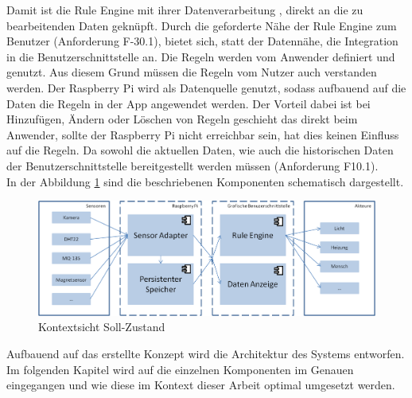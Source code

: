 Damit ist die Rule Engine mit ihrer Datenverarbeitung \cite{Hayes-Roth:1985:RS:4284.4286}, direkt an die zu bearbeitenden Daten geknüpft. Durch die geforderte Nähe der Rule Engine zum Benutzer (Anforderung F-30.1), bietet sich, statt der Datennähe, die Integration in die Benutzerschnittstelle an. Die Regeln werden vom Anwender definiert und genutzt. Aus diesem Grund müssen die Regeln vom Nutzer auch verstanden werden. Der Raspberry Pi wird als Datenquelle genutzt, sodass aufbauend auf die Daten die Regeln in der App angewendet werden. Der Vorteil dabei ist bei Hinzufügen, Ändern oder Löschen von Regeln geschieht das direkt beim Anwender, sollte der Raspberry Pi nicht erreichbar sein, hat dies keinen Einfluss auf die Regeln. Da sowohl die aktuellen Daten, wie auch die historischen Daten der Benutzerschnittstelle bereitgestellt werden müssen (Anforderung F10.1).\\
In der Abbildung \ref{fig:M1} sind die beschriebenen Komponenten schematisch dargestellt.\\
\begin{figure}
	\centering
	\includegraphics[width=1\textwidth]{images/Konzept_allgemein.png}
	\caption{Kontextsicht Soll-Zustand}
	\label{fig:M1}
\end{figure}
Aufbauend auf das erstellte Konzept wird die Architektur des Systems entworfen. Im folgenden Kapitel wird auf die einzelnen Komponenten im Genauen eingegangen und wie diese im Kontext dieser Arbeit optimal umgesetzt werden. 